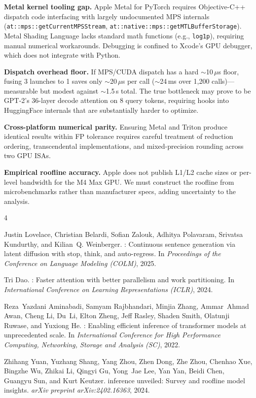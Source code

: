 \documentclass[sigconf,authordraft]{acmart}
\begin{document}
\textbf{Metal kernel tooling gap.} Apple Metal for PyTorch requires Objective-C++ dispatch code interfacing with largely undocumented MPS internals (\texttt{at::mps::getCurrentMPSStream}, \linebreak\texttt{at::native::mps::getMTLBufferStorage}). Metal Shading Language lacks standard math functions (e.g., \texttt{log1p}), requiring manual numerical workarounds. Debugging is confined to Xcode's GPU debugger, which does not integrate with Python.

\textbf{Dispatch overhead floor.} If MPS/CUDA dispatch has a hard ${\sim}$10\,$\mu$s floor, fusing 3 launches to 1 saves only ${\sim}$20\,$\mu$s per call (${\sim}$24\,ms over 1{,}200 calls)---measurable but modest against ${\sim}$1.5\,s total. The true bottleneck may prove to be GPT-2's 36-layer decode attention on 8 query tokens, requiring hooks into HuggingFace internals that are substantially harder to optimize.

\textbf{Cross-platform numerical parity.} Ensuring Metal and Triton produce identical results within FP tolerance requires careful treatment of reduction ordering, transcendental implementations, and mixed-precision rounding across two GPU ISAs.

\textbf{Empirical roofline accuracy.} Apple does not publish L1/L2 cache sizes or per-level bandwidth for the M4 Max GPU. We must construct the roofline from microbenchmarks rather than manufacturer specs, adding uncertainty to the analysis.


\begin{thebibliography}{4}

Justin Lovelace, Christian Belardi, Sofian Zalouk, Adhitya Polavaram, Srivatsa Kundurthy, and Kilian~Q. Weinberger.
: Continuous sentence generation via latent diffusion with stop, think, and auto-regress.
\newblock In \emph{Proceedings of the Conference on Language Modeling (COLM)}, 2025.

Tri Dao.
: Faster attention with better parallelism and work partitioning.
\newblock In \emph{International Conference on Learning Representations (ICLR)}, 2024.

Reza~Yazdani Aminabadi, Samyam Rajbhandari, Minjia Zhang, Ammar~Ahmad Awan, Cheng Li, Du~Li, Elton Zheng, Jeff Rasley, Shaden Smith, Olatunji Ruwase, and Yuxiong He.
: Enabling efficient inference of transformer models at unprecedented scale.
\newblock In \emph{International Conference for High Performance Computing, Networking, Storage and Analysis (SC)}, 2022.

Zhihang Yuan, Yuzhang Shang, Yang Zhou, Zhen Dong, Zhe Zhou, Chenhao Xue, Bingzhe Wu, Zhikai Li, Qingyi Gu, Yong~Jae Lee, Yan Yan, Beidi Chen, Guangyu Sun, and Kurt Keutzer.
 inference unveiled: Survey and roofline model insights.
\newblock \emph{arXiv preprint arXiv:2402.16363}, 2024.

\end{thebibliography}
\end{document}
